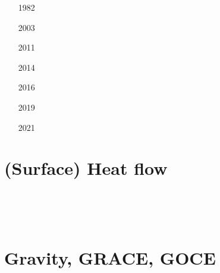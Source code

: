 \begin{scriptsize}
\begin{itemize}
\item[1982]
\textcite{tapl82} 
\item[2003]
\textcite{hukm03} 
\item[2011]
\textcite{seep11} 
\item[2014]
\textcite{capi14} 
\item[2016]
\textcite{capi16} 
\item[2019]
\textcite{sccs19} 
\item[2021]
\textcite{cull21} 
\end{itemize}
\end{scriptsize}



\section{(Surface) Heat flow}
\begin{scriptsize}
\begin{itemize}
\item[\nineteensixtyseven] 
\textcite{mcke67} \\
\item[\nineteenninetynine] 
\textcite{dudf99} \\
\item[\twothousandten] 
\textcite{dada10} 
\item[\twothousandtwenty]
\textcite{moku20} 
\end{itemize}
\end{scriptsize}

\section{Gravity, GRACE, GOCE}

